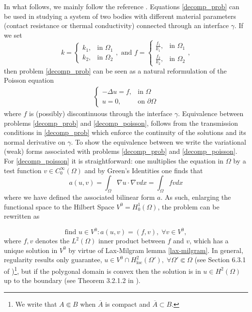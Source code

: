In what follows, we mainly follow the reference \cite{quarteroni1999domain}. Equations \eqref{decomp_prob} can be used in studying a system of two bodies with different material parameters (contact resistance or thermal conductivity) connected through an interface \(\gamma\). If we set
\[
k = \begin{cases}
    k_1,& \text{in } \Omega_1\\
    k_2,& \text{in } \Omega_2
\end{cases}, \text{ and }
f = \begin{cases}
    \frac{f_1}{k_1},& \text{in } \Omega_1\\
    \frac{f_2}{k_2},& \text{in } \Omega_2
\end{cases},   
\]
then problem \eqref{decomp_prob} can be seen as a natural reformulation of the Poisson equation
\begin{align}\label{decomp_poisson}
    \begin{cases}
        -\Delta u = f, & \text{in }\Omega \\
        u = 0, & \text{on } \partial\Omega
    \end{cases}
\end{align}
where \(f\) is (possibly) discontinuous through the interface \(\gamma\). Equivalence between problems \eqref{decomp_prob} and \eqref{decomp_poisson}, follows from the transmission conditions in \eqref{decomp_prob} which enforce the continuity of the solutions and its normal derivative on \(\gamma\). To show the equivalence between we write the variational (weak) forms associated with problems \eqref{decomp_prob} and \eqref{decomp_poisson}. For \eqref{decomp_poisson} it is straightforward: one multiplies the equation in \(\Omega\) by a test function \(v \in C^\infty_0(\Omega)\) and by Green's Identities one finds that
\[
a(u,v)=\int_\Omega \nabla u \cdot \nabla v dx = \int_\Omega f v dx
\]
where we have defined the associated bilinear form \(a\). As such, enlarging the functional space to the Hilbert Space \(V^0=H^1_0(\Omega)\), the problem can be rewritten as

\begin{equation}\label{weak_poisson}
    \text{find } u \in V^0: a(u,v) = (f, v), \; \forall v \in V^0,   
\end{equation}
where \(f,v\) denotes the \(L^2(\Omega)\) inner product between \(f\) and \(v\), which has a unique solution in \(V^0\) by virtue of Lax-Milgram lemma \ref{lax-milgram}. In general, regularity results only guarantee, \(u \in V^0 \cap H^2_{\text{loc}}(\Omega'), \; \forall \Omega' \Subset \Omega\) (see Section 6.3.1 of \cite{evans2022partial})\footnote{We write that \(A \Subset B\) when \(\overline{A}\) is compact and \(\overline{A} \subset B\).}, but if the polygonal domain is convex then the solution is in \(u \in H^2(\Omega)\) up to the boundary (see Theorem 3.2.1.2 in \cite{grisvard2011elliptic}). 

